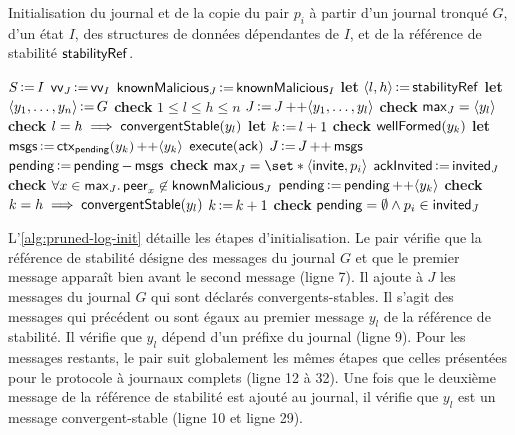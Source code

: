 \begin{algorithm}[ht]
\caption{Initialisation du journal et de la copie du pair $p_i$ à partir d'un journal tronqué $G$, d'un état $I$, des structures de données dépendantes de $I$, et de la référence de stabilité $\trm{stabilityRef}$.}\label{alg:pruned-log-init}
\begin{algorithmic}[1]
    \State $S \assign I$
    \State $\trm{vv}_J \assign \trm{vv}_I$
    \State $\trm{knownMalicious}_J \assign \trm{knownMalicious}_I$
    \State \textbf{let} $\tuple*{l,h} \assign \trm{stabilityRef}$
    \State \textbf{let} $\tuple*{y_1, \dotsc, y_n} \assign G$
    \State \textbf{check} $1 \leq l \leq h \leq n$
    \State $J \assign J \lappend \tuple*{y_1,\dotsc,y_l}$
    \State \textbf{check} $\trm{max}_J = \tuple*{y_l}$
    \State \textbf{check} $l = h \implies \trm{convergentStable}(y_l)$
    \State \textbf{let} $k \assign l + 1$
        \State \textbf{check} $\trm{wellFormed}(y_k)$
            \State \textbf{let} $\trm{msgs} \assign \trm{ctx}_{\trm{pending}}(y_k) \lappend \tuple*{y_k}$
                \State $\trm{execute}(\trm{ack})$
            \EndIf
            \State $J \assign J \lappend \trm{msgs}$
            \State $\trm{pending} \assign \trm{pending} \sminus \trm{msgs}$
                \State \textbf{check} $\trm{max}_J = \set*{\tuple*{\trm{invite}, p_i}}$
                \State $\trm{ackInvited} \assign \trm{invited}_J$
            \EndIf
            \State \textbf{check} $\forall x \in \trm{max}_J \qsep \trm{peer}_x \not\in \trm{knownMalicious}_J$
        \Else
            \State $\trm{pending} \assign \trm{pending} \lappend \tuple*{y_k}$
        \EndIf
        \State \textbf{check} $k = h \implies \trm{convergentStable}(y_l)$
        \State $k \assign k + 1$
    \EndWhile
    \State \textbf{check} $\trm{pending} = \emptyset \land p_i \in \trm{invited}_J$
\EndProcedure
\end{algorithmic}
\end{algorithm}

\clearpage

L'\autoref{alg:pruned-log-init} détaille les étapes d'initialisation.
Le pair vérifie que la référence de stabilité désigne des messages du journal $G$ et que le premier message apparaît bien avant le second message (ligne 7).
Il ajoute à $J$ les messages du journal $G$ qui sont déclarés convergents-stables.
Il s'agit des messages qui précédent ou sont égaux au premier message $y_l$ de la référence de stabilité.
Il vérifie que $y_l$ dépend d'un préfixe du journal (ligne 9).
Pour les messages restants, le pair suit globalement les mêmes étapes que celles présentées pour le protocole à journaux complets (ligne 12 à 32).
Une fois que le deuxième message de la référence de stabilité est ajouté au journal, il vérifie que $y_l$ est un message convergent-stable (ligne 10 et ligne 29).

